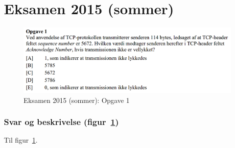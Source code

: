 \newcommand\argang{Eksamen 2015 (sommer)}
\section{\argang}

\begin{figure}[H]
	\centering
	\includegraphics[width=\linewidth]{figs/sommer15/SE15OP1}
	\caption{\argang: Opgave 1}
	\label{fig:SE15OP1}
\end{figure}

\subsubsection{Svar og beskrivelse (figur~\ref{fig:SE15OP1})}
Til figur~\ref{fig:SE15OP1}. 
\derp

